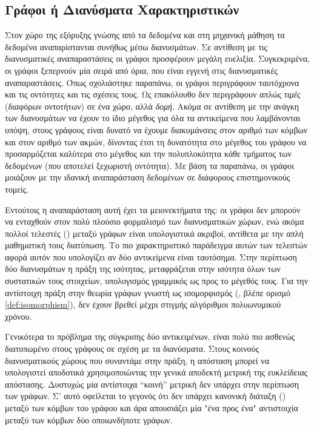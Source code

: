 \subsection{Γράφοι ή Διανύσματα Χαρακτηριστικών}
Στον χώρο της εξόρυξης γνώσης από τα δεδομένα και στη μηχανική μάθηση τα δεδομένα αναπαρίστανται συνήθως μέσω διανυσμάτων.
Σε αντίθεση με τις διανυσματικές αναπαραστάσεις οι γράφοι προσφέρουν μεγάλη ευελιξία.
Συγκεκριμένα, οι γράφοι ξεπερνούν μία σειρά από όρια, που είναι εγγενή στις διανυσματικές αναπαραστάσεις.
Όπως σχολιάστηκε παραπάνω, οι γράφοι περιγράφουν ταυτόχρονα και τις οντότητες και τις σχέσεις τους.
Ως επακόλουθο δεν περιγράφουν απλώς \textit{τιμές} (διαφόρων οντοτήτων) σε ένα χώρο, αλλά \textit{δομή}.
Ακόμα σε αντίθεση με την ανάγκη των διανυσμάτων να έχουν το ίδιο μέγεθος για όλα τα αντικείμενα που λαμβάνονται υπόψη, στους γράφους είναι δυνατό να έχουμε διακυμάνσεις στον αριθμό των κόμβων και στον αριθμό των ακμών, δίνοντας έτσι τη δυνατότητα στο μέγεθος του γράφου να προσαρμόζεται καλύτερα στο μέγεθος και την πολυπλοκότητα κάθε τμήματος των δεδομένων (που αποτελεί ξεχωριστή οντότητα).
Με βάση τα παραπάνω, οι γράφοι μοιάζουν με την ιδανική αναπαράσταση δεδομένων σε διάφορους επιστημονικούς τομείς.\par
Εντούτοις η αναπαράσταση αυτή έχει τα μειονεκτήματα της: οι γράφοι δεν μπορούν να ενταχθούν στον πολύ πλούσιο φορμαλισμό των διανυσματικών χώρων, ενώ ακόμα πολλοί τελεστές () μεταξύ γράφων είναι υπολογιστικά ακριβοί, αντίθετα με την απλή μαθηματική τους διατύπωση.
Το πιο χαρακτηριστικό παράδειγμα αυτών των τελεστών αφορά αυτόν που υπολογίζει αν δύο αντικείμενα είναι ταυτόσημα.
Στην περίπτωση δύο διανυσμάτων η πράξη της ισότητας, μεταφράζεται στην ισότητα όλων των συστατικών τους στοιχείων, υπολογισμός γραμμικός ως προς το μέγεθός τους.
Για την αντίστοιχη πράξη στην θεωρία γράφων γνωστή ως ισομορφισμός (, βλέπε ορισμό \ref{def:isomorphism}), δεν έχουν βρεθεί μέχρι στιγμής αλγόριθμοι πολυωνυμικού χρόνου.\par
Γενικότερα το πρόβλημα της σύγκρισης δύο αντικειμένων, είναι πολύ πιο ασθενώς διατυπωμένο στους γράφους σε σχέση με τα διανύσματα.
Στους κοινούς διανυσματικούς χώρους που συναντάμε στην πράξη, η απόσταση μπορεί να υπολογιστεί αποδοτικά χρησιμοποιώντας την γενικά αποδεκτή μετρική της ευκλείδειας απόστασης.
Δυστυχώς μία αντίστοιχα ``κοινή'' μετρική δεν υπάρχει στην περίπτωση των γράφων.
Σ' αυτό οφείλεται το γεγονός ότι δεν υπάρχει κανονική διάταξη () μεταξύ των κόμβων του γράφου και άρα απουσιάζει μία "ένα προς ένα" αντιστοιχία μεταξύ των κόμβων δύο οποιωνδήποτε γράφων.
